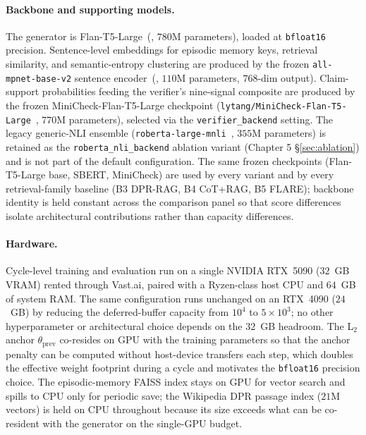 \paragraph{Backbone and supporting models.}
The generator is Flan-T5-Large~(\cite{JMLR:v25:23-0870}, $780$M
parameters), loaded at \texttt{bfloat16} precision. Sentence-level
embeddings for episodic memory keys, retrieval similarity, and
semantic-entropy clustering are produced by the frozen
\texttt{all-mpnet-base-v2} sentence
encoder~(\cite{reimers-gurevych-2019-sentence}, $110$M parameters,
$768$-dim output). Claim-support probabilities
feeding the verifier's nine-signal composite are produced by the
frozen MiniCheck-Flan-T5-Large checkpoint
(\texttt{lytang/MiniCheck-Flan-T5-Large}~\citep{tang2024minicheck},
$770$M parameters), selected via the \texttt{verifier\_backend}
setting. The legacy generic-NLI ensemble
(\texttt{roberta-large-mnli}~\cite{liu2019roberta}, $355$M
parameters) is retained as the \texttt{roberta\_nli\_backend}
ablation variant (Chapter 5 \S\ref{sec:ablation}) and is not part of
the default configuration. The same frozen checkpoints (Flan-T5-Large
base, SBERT, MiniCheck) are used by every \caem{} variant and by
every retrieval-family baseline (B3 DPR-RAG, B4 CoT+RAG, B5 FLARE);
backbone identity is held constant across the comparison panel so
that score differences isolate architectural contributions rather
than capacity differences.

\paragraph{Hardware.}
Cycle-level training and evaluation run on a single NVIDIA
RTX~5090 ($32$~GB VRAM) rented through Vast.ai, paired with a
Ryzen-class host CPU and $64$~GB of system RAM. The same
configuration runs unchanged on an RTX~4090 ($24$~GB) by reducing
the deferred-buffer capacity from $10^{4}$ to $5 \times 10^{3}$; no
other hyperparameter or architectural choice depends on the $32$~GB
headroom. The L$_2$ anchor $\theta_{\text{prev}}$ co-resides on GPU
with the training parameters so that the anchor penalty can be
computed without host-device transfers each step, which doubles the
effective weight footprint during a cycle and motivates the
\texttt{bfloat16} precision choice. The episodic-memory FAISS index
stays on GPU for vector search and spills to CPU only for periodic
save; the Wikipedia DPR passage index ($21$M vectors) is held on CPU
throughout because its size exceeds what can be co-resident with the
generator on the single-GPU budget.

